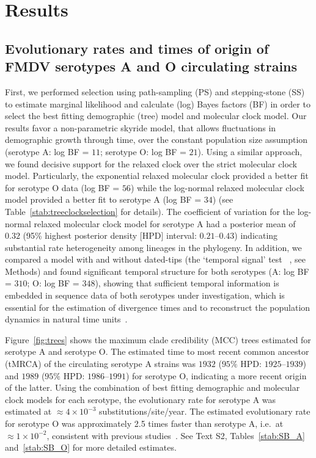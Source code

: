 \documentclass[10pt]{article}
\begin{document}
\section*{Results}

\subsection*{Evolutionary rates and times of origin of FMDV serotypes A and O circulating strains}

First, we performed selection using path-sampling (PS) and stepping-stone (SS) to estimate marginal likelihood and calculate (log) Bayes factors (BF) in order to select the best fitting demographic (tree) model and molecular clock model.
Our results favor a non-parametric skyride model, that allows fluctuations in demographic growth through time, over the constant population size assumption (serotype A: log BF = $11$; serotype O: log BF = $21$).
Using a similar approach, we  found decisive support for the relaxed clock over the strict molecular clock model.
Particularly, the exponential relaxed molecular clock provided a better fit for serotype O data (log BF = $56$) while the log-normal relaxed molecular clock model provided a better fit to serotype A (log BF = $34$) (see Table~\ref{stab:treeclockselection} for details). 
The coefficient of variation for the log-normal relaxed molecular clock model for serotype A had a posterior mean of $0.32$ (95\% highest posterior density [HPD] interval: $0.21$--$0.43$) indicating substantial rate heterogeneity among lineages in the phylogeny.
In addition, we compared a model with and without dated-tips (the `temporal signal' test~\cite{Faria2012} , see Methods) and found significant temporal structure for both serotypes (A: log BF = $310$; O: log BF = $348$), showing that sufficient temporal information is embedded in sequence data of both serotypes under investigation, which is essential for the estimation of divergence times and to reconstruct the population dynamics in natural time units~\cite{MEP}. 

Figure~\ref{fig:trees} shows the maximum clade credibility (MCC) trees estimated for serotype A and serotype O.
The estimated time to most recent common ancestor (tMRCA) of the circulating serotype A strains was $1932$ ($95\%$ HPD: $1925$--$1939$) and  $1989$ ($95\%$ HPD: $ 1986$--$1991$) for serotype O, indicating a more recent origin of the latter. 
Using the combination of best fitting demographic and molecular clock models for each serotype, the evolutionary rate for serotype A was estimated at $\approx 4 \times 10^{-3}$ substitutions/site/year.
The estimated evolutionary rate for serotype O was approximately 2.5 times faster than serotype A, i.e.~at $\approx 1 \times 10^{-2}$, consistent with previous studies~\cite{tully, Carvalho2013, Muellner2011}.
See Text S2, Tables~\ref{stab:SB_A} and~\ref{stab:SB_O} for more detailed estimates.
\end{document}
